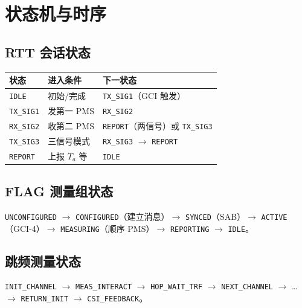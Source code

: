 \documentclass[11pt,a4paper]{ctexart}
\begin{document}
\section{状态机与时序}

\subsection{RTT 会话状态}

\begin{table}[h]
\centering
\small
\begin{tabular}{lll}
\toprule
\textbf{状态} & \textbf{进入条件} & \textbf{下一状态} \\
\midrule
\texttt{IDLE} & 初始/完成 & \texttt{TX\_SIG1}（GCI 触发） \\
\texttt{TX\_SIG1} & 发第一 PMS & \texttt{RX\_SIG2} \\
\texttt{RX\_SIG2} & 收第二 PMS & \texttt{REPORT}（两信号）或 \texttt{TX\_SIG3} \\
\texttt{TX\_SIG3} & 三信号模式 & \texttt{RX\_SIG3} $\rightarrow$ \texttt{REPORT} \\
\texttt{REPORT} & 上报 $T_a$ 等 & \texttt{IDLE} \\
\bottomrule
\end{tabular}
\end{table}

\subsection{FLAG 测量组状态}

\texttt{UNCONFIGURED} $\rightarrow$ \texttt{CONFIGURED}（建立消息）$\rightarrow$ \texttt{SYNCED}（SAB）$\rightarrow$ \texttt{ACTIVE}（GCI-4）$\rightarrow$ \texttt{MEASURING}（顺序 PMS）$\rightarrow$ \texttt{REPORTING} $\rightarrow$ \texttt{IDLE}。

\subsection{跳频测量状态}

\texttt{INIT\_CHANNEL} $\rightarrow$ \texttt{MEAS\_INTERACT} $\rightarrow$ \texttt{HOP\_WAIT\_TRF} $\rightarrow$ \texttt{NEXT\_CHANNEL} $\rightarrow$ \ldots $\rightarrow$ \texttt{RETURN\_INIT} $\rightarrow$ \texttt{CSI\_FEEDBACK}。

\end{document}
